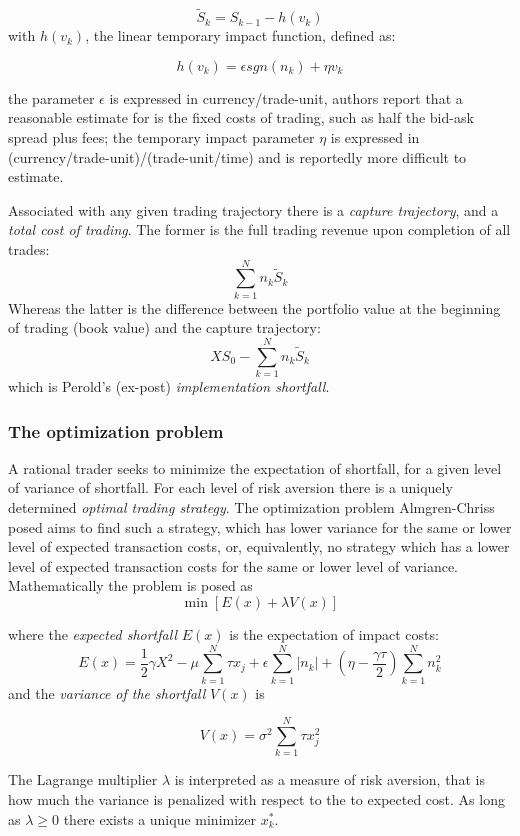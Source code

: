 \[ \tilde{S}_{k} = S_{k-1} - h(v_{k}) \] with \(h(v_{k})\), the linear
temporary impact function, defined as:

\[ h(v_{k}) = \epsilon sgn(n_{k}) + \eta v_{k} \]

the parameter \(\epsilon\) is expressed in currency/trade-unit, authors
report that a reasonable estimate for is the fixed costs of trading,
such as half the bid-ask spread plus fees; the temporary impact
parameter \(\eta\) is expressed in
(currency/trade-unit)/(trade-unit/time) and is reportedly more difficult
to estimate.

Associated with any given trading trajectory there is a
\emph{capture trajectory}, and a \emph{total cost of trading}. The
former is the full trading revenue upon completion of all trades:
\[ \sum_{k=1}^{N}{n_{k}  \tilde{S}_{k}} \] Whereas the latter is the
difference between the portfolio value at the beginning of trading (book
value) and the capture trajectory:
\[ XS_{0} - \sum_{k=1}^{N}{n_{k} \tilde{S}_{k}} \] which is Perold's
(ex-post) \emph{implementation shortfall}.

\hypertarget{the-optimization-problem}{%
\subsubsection{The optimization
problem}\label{the-optimization-problem}}

A rational trader seeks to minimize the expectation of shortfall, for a
given level of variance of shortfall. For each level of risk aversion
there is a uniquely determined \emph{optimal trading strategy}. The
optimization problem Almgren-Chriss posed aims to find such a strategy,
which has lower variance for the same or lower level of expected
transaction costs, or, equivalently, no strategy which has a lower level
of expected transaction costs for the same or lower level of variance.
Mathematically the problem is posed as \[ \min[E(x) + \lambda V(x)] \]

where the \emph{expected shortfall} \(E(x)\) is the expectation of
impact costs:
\[ E(x) = \frac{1}{2}\gamma X^2 - \mu\sum_{k=1}^{N}{\tau x_{j}} + \epsilon\sum_{k=1}^{N}{|n_{k}|} + (\eta - \frac{\gamma\tau}{2})\sum_{k=1}^{N}{n_{k}^2} \]
and the \emph{variance of the shortfall} \(V(x)\) is

\[ V(x) = \sigma^2 \sum_{k=1}^{N}{\tau x_{j}^2} \]

The Lagrange multiplier \(\lambda\) is interpreted as a measure of risk
aversion, that is how much the variance is penalized with respect to the
to expected cost. As long as \(\lambda \geq 0\) there exists a unique
minimizer \(x_{k}^{*}\).

